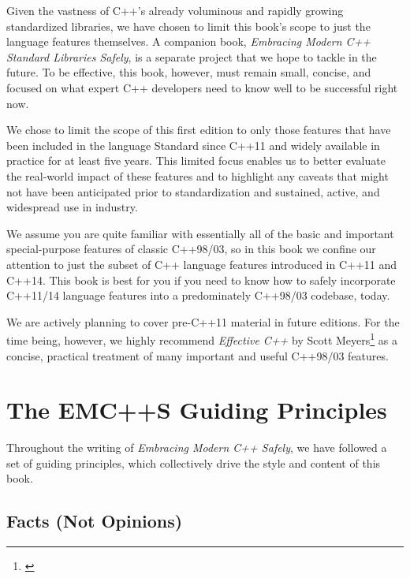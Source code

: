 Given the vastness of C++'s already voluminous and rapidly growing standardized libraries, we have chosen to limit this book’s scope to just the language features themselves. A companion book, \textit{Embracing Modern C++ Standard Libraries Safely}, is a separate project that we hope to tackle in the future. To be effective, this book, however, must remain small, concise, and focused on what expert C++ developers need to know well to be successful right now.

We chose to limit the scope of this first edition to only those features that have been included in the language Standard since C++11 and widely available in practice for at least five years. This limited focus enables us to better evaluate the real-world impact of these features and to highlight any caveats that might not have been anticipated prior to standardization and sustained, active, and widespread use in industry.%

\enlargethispage*{-1ex}
We assume you are quite familiar with essentially all of the basic and important special-purpose features of classic C++98/03, so in this book we confine our attention to just the subset of C++ language features introduced in C++11 and C++14. 
This book is best for 
you if you need to know how to safely incorporate C++11/14 language features into a predominately C++98/03 codebase, today.

We are actively planning to cover pre-C++11 material in future editions. For the time being, however, we highly recommend \textit{Effective C++} by Scott Meyers\footnote{\cite{meyers05}} as a concise, practical treatment of many important and useful C++98/03 features.

\section[The {\itshape EMC++S} Guiding Principles]{The {\sfbsectionitalRomeo EMC++S} Guiding Principles}

Throughout the writing of \textit{Embracing Modern C++ Safely}, we have followed a set of guiding principles, which collectively drive the style and content of this book.

\subsection{Facts (Not Opinions)}

